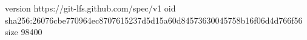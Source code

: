 version https://git-lfs.github.com/spec/v1
oid sha256:26076cbe770964ec8707615237d5d15a60d84573630045758b16f06d4d766f56
size 98400
